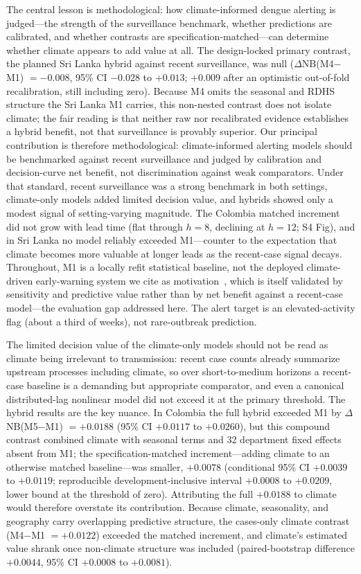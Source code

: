 \documentclass[11pt,a4paper]{article}
\begin{document}
The central lesson is methodological: how climate-informed dengue alerting is judged---the strength of the surveillance benchmark, whether predictions are calibrated, and whether contrasts are specification-matched---can determine whether climate appears to add value at all. The design-locked primary contrast, the planned Sri Lanka hybrid against recent surveillance, was null ($\Delta$NB(M4$-$M1) $=-0.008$, 95\% CI $-0.028$ to $+0.013$; $+0.009$ after an optimistic out-of-fold recalibration, still including zero). Because M4 omits the seasonal and RDHS structure the Sri Lanka M1 carries, this non-nested contrast does not isolate climate; the fair reading is that neither raw nor recalibrated evidence establishes a hybrid benefit, not that surveillance is provably superior. Our principal contribution is therefore methodological: climate-informed alerting models should be benchmarked against recent surveillance and judged by calibration and decision-curve net benefit, not discrimination against weak comparators. Under that standard, recent surveillance was a strong benchmark in both settings, climate-only models added limited decision value, and hybrids showed only a modest signal of setting-varying magnitude. The Colombia matched increment did not grow with lead time (flat through $h=8$, declining at $h=12$; S4 Fig), and in Sri Lanka no model reliably exceeded M1---counter to the expectation that climate becomes more valuable at longer leads as the recent-case signal decays. Throughout, M1 is a locally refit statistical baseline, not the deployed climate-driven early-warning system we cite as motivation~\cite{EWARScsd}, which is itself validated by sensitivity and predictive value rather than by net benefit against a recent-case model---the evaluation gap addressed here. The alert target is an elevated-activity flag (about a third of weeks), not rare-outbreak prediction.

The limited decision value of the climate-only models should not be read as climate being irrelevant to transmission: recent case counts already summarize upstream processes including climate, so over short-to-medium horizons a recent-case baseline is a demanding but appropriate comparator, and even a canonical distributed-lag nonlinear model did not exceed it at the primary threshold. The hybrid results are the key nuance. In Colombia the full hybrid exceeded M1 by $\Delta$NB(M5$-$M1) $=+0.0188$ (95\% CI $+0.0117$ to $+0.0260$), but this compound contrast combined climate with seasonal terms and 32 department fixed effects absent from M1; the specification-matched increment---adding climate to an otherwise matched baseline---was smaller, $+0.0078$ (conditional 95\% CI $+0.0039$ to $+0.0119$; reproducible development-inclusive interval $+0.0008$ to $+0.0209$, lower bound at the threshold of zero). Attributing the full $+0.0188$ to climate would therefore overstate its contribution. Because climate, seasonality, and geography carry overlapping predictive structure, the cases-only climate contrast (M4$-$M1 $=+0.0122$) exceeded the matched increment, and climate's estimated value shrank once non-climate structure was included (paired-bootstrap difference $+0.0044$, 95\% CI $+0.0008$ to $+0.0081$).
\end{document}
